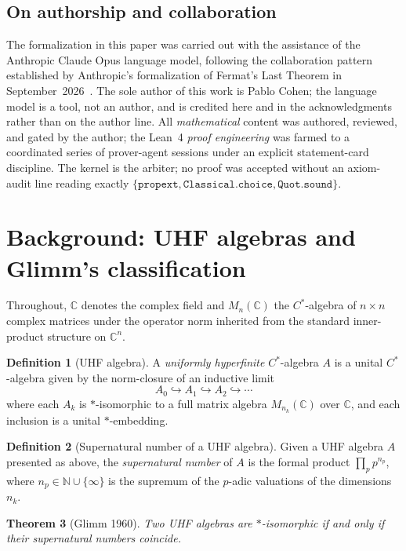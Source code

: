 \documentclass[11pt,a4paper]{article}
\theoremstyle{plain}
\newtheorem{theorem}{Theorem}[section]
\theoremstyle{definition}
\newtheorem{definition}[theorem]{Definition}
\begin{document}
\subsection*{On authorship and collaboration}
The formalization in this paper was carried out with the assistance of the Anthropic Claude Opus language model, following the collaboration pattern established by Anthropic's formalization of Fermat's Last Theorem in September~2026~\cite{anthropic_flt_2026}. The sole author of this work is Pablo Cohen; the language model is a tool, not an author, and is credited here and in the acknowledgments rather than on the author line. All \emph{mathematical} content was authored, reviewed, and gated by the author; the Lean~4 \emph{proof engineering} was farmed to a coordinated series of prover-agent sessions under an explicit statement-card discipline. The kernel is the arbiter; no proof was accepted without an axiom-audit line reading exactly $\{\texttt{propext}, \texttt{Classical.choice}, \texttt{Quot.sound}\}$.

\section{Background: UHF algebras and Glimm's classification}
\label{sec:background}

Throughout, $\mathbb{C}$ denotes the complex field and $M_n(\mathbb{C})$ the $C^{\ast}$-algebra of $n \times n$ complex matrices under the operator norm inherited from the standard inner-product structure on $\mathbb{C}^n$.

\begin{definition}[UHF algebra]
A \emph{uniformly hyperfinite} $C^{\ast}$-algebra $A$ is a unital $C^{\ast}$-algebra given by the norm-closure of an inductive limit
\[
A_0 \hookrightarrow A_1 \hookrightarrow A_2 \hookrightarrow \cdots
\]
where each $A_k$ is $\ast$-isomorphic to a full matrix algebra $M_{n_k}(\mathbb{C})$ over $\mathbb{C}$, and each inclusion is a unital $\ast$-embedding.
\end{definition}

\begin{definition}[Supernatural number of a UHF algebra]
Given a UHF algebra $A$ presented as above, the \emph{supernatural number} of $A$ is the formal product $\prod_p p^{n_p}$, where $n_p \in \mathbb{N} \cup \{\infty\}$ is the supremum of the $p$-adic valuations of the dimensions $n_k$.
\end{definition}

\begin{theorem}[Glimm 1960]
\label{thm:glimm}
Two UHF algebras are $\ast$-isomorphic if and only if their supernatural numbers coincide.
\end{theorem}
\end{document}
